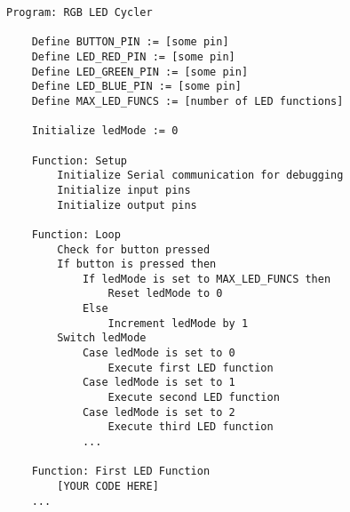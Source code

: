 \begin{lstlisting}[linewidth=1.5\textwidth]
    Program: RGB LED Cycler

    Define BUTTON_PIN := [some pin]
    Define LED_RED_PIN := [some pin]
    Define LED_GREEN_PIN := [some pin]
    Define LED_BLUE_PIN := [some pin]
    Define MAX_LED_FUNCS := [number of LED functions]

    Initialize ledMode := 0

    Function: Setup
        Initialize Serial communication for debugging
        Initialize input pins
        Initialize output pins

    Function: Loop
        Check for button pressed
        If button is pressed then
            If ledMode is set to MAX_LED_FUNCS then
                Reset ledMode to 0
            Else
                Increment ledMode by 1
        Switch ledMode
            Case ledMode is set to 0
                Execute first LED function
            Case ledMode is set to 1
                Execute second LED function
            Case ledMode is set to 2
                Execute third LED function
            ...
    
    Function: First LED Function
        [YOUR CODE HERE]
    ...

\end{lstlisting}
